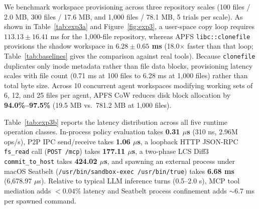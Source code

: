 \documentclass[acmsmall,screen,review]{acmart}
\begin{document}
We benchmark workspace provisioning across three repository scales (100 files / 2.0 MB, 300 files / 17.6 MB, and 1,000 files / 78.1 MB, 5 trials per scale). As shown in Table~\ref{tab:exp3a} and Figure~\ref{fig:exp3}, a user-space copy loop requires $113.13 \pm 16.41$ ms for the 1,000-file repository, whereas APFS \texttt{libc::clonefile} provisions the shadow workspace in \textbf{$6.28 \pm 0.65$ ms} (18.0$\times$ faster than that loop; Table~\ref{tab:baselines} gives the comparison against real tools). Because \texttt{clonefile} duplicates only inode metadata rather than file data blocks, provisioning latency scales with file count (0.71 ms at 100 files to 6.28 ms at 1,000 files) rather than total byte size. Across 10 concurrent agent workspaces modifying working sets of 6, 12, and 25 files per agent, APFS CoW reduces disk block allocation by \textbf{94.0\%--97.5\%} (19.5 MB vs.\ 781.2 MB at 1,000 files).

Table~\ref{tab:exp3b} reports the latency distribution across all five runtime operation classes. In-process policy evaluation takes \textbf{0.31 $\mu$s} (310 ns, 2.96M ops/s), P2P IPC send/receive takes \textbf{1.06 $\mu$s}, a loopback HTTP JSON-RPC \texttt{fs\_read} call (\texttt{POST /mcp}) takes \textbf{177.11 $\mu$s}, a two-phase LCS Diff3 \texttt{commit\_to\_host} takes \textbf{424.02 $\mu$s}, and spawning an external process under macOS Seatbelt (\texttt{/usr/bin/sandbox-exec /usr/bin/true}) takes \textbf{6.68 ms} (6,678.97 $\mu$s). Relative to typical LLM inference turns (0.5--2.0 s), MCP tool mediation adds $<0.04\%$ latency and Seatbelt process confinement adds $\sim$6.7 ms per spawned command.
\end{document}
